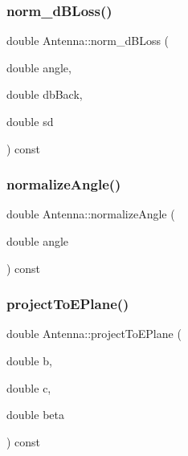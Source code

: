\subsubsection{\texorpdfstring{norm\+\_\+d\+B\+Loss()}{norm\_dBLoss()}}
{\footnotesize\ttfamily double Antenna\+::norm\+\_\+d\+B\+Loss (\begin{DoxyParamCaption}\item[{double}]{angle,  }\item[{double}]{db\+Back,  }\item[{double}]{sd }\end{DoxyParamCaption}) const\hspace{0.3cm}{\ttfamily [private]}}

\mbox{\label{class_antenna_a353ae3aafbc75033c30fb96004c2b73f}} 
\subsubsection{\texorpdfstring{normalize\+Angle()}{normalizeAngle()}}
{\footnotesize\ttfamily double Antenna\+::normalize\+Angle (\begin{DoxyParamCaption}\item[{double}]{angle }\end{DoxyParamCaption}) const\hspace{0.3cm}{\ttfamily [private]}}

\mbox{\label{class_antenna_a298c80a54828c8f13d584e8e382145a5}} 
\subsubsection{\texorpdfstring{project\+To\+E\+Plane()}{projectToEPlane()}}
{\footnotesize\ttfamily double Antenna\+::project\+To\+E\+Plane (\begin{DoxyParamCaption}\item[{double}]{b,  }\item[{double}]{c,  }\item[{double}]{beta }\end{DoxyParamCaption}) const\hspace{0.3cm}{\ttfamily [private]}}

\mbox{\label{class_antenna_aa21a4c0d581c59c36480d932584c0ef5}} 

